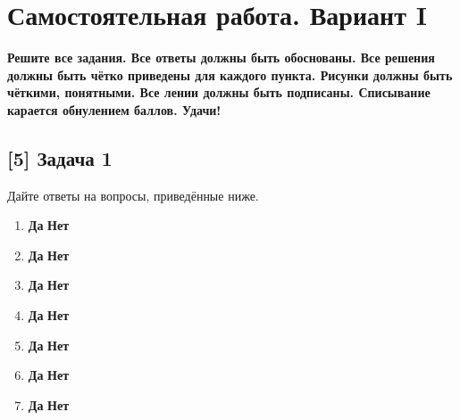 \documentclass[12pt, a4paper, oneside]{article}
\begin{document}
\section*{Самостоятельная работа. Вариант I}

\textbf{Решите все задания. Все ответы должны быть обоснованы. Все решения должны быть чётко приведены для каждого пункта. Рисунки должны быть чёткими, понятными. Все лении должны быть подписаны. Списывание карается обнулением баллов. Удачи!}

\subsection*{[5] Задача 1 }

Дайте ответы на вопросы, приведённые ниже. 

\begin{enumerate}
	\item  
	
	\hspace{2cm} \textbf{Да}  \hspace{4cm} \textbf{Нет} 
		
	\item 
	
	\hspace{2cm} \textbf{Да}  \hspace{4cm} \textbf{Нет} 
		
	\item 
	
	\hspace{2cm} \textbf{Да}  \hspace{4cm} \textbf{Нет} 
		
	\item 	
	
	\hspace{2cm} \textbf{Да}  \hspace{4cm} \textbf{Нет} 
	
	\item 
	
	\hspace{2cm} \textbf{Да}  \hspace{4cm} \textbf{Нет} 
	
	\item 
	
	\hspace{2cm} \textbf{Да}  \hspace{4cm} \textbf{Нет} 
		
	\item 
	
	\hspace{2cm} \textbf{Да}  \hspace{4cm} \textbf{Нет} 
	

\end{enumerate}
\end{document}
